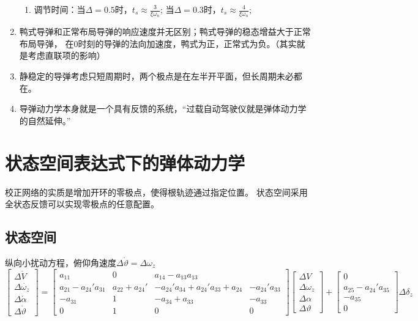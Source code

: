 \begin{enumerate}[1)]
{\begin{enumerate}[i]
        \item 调节时间：当$\Delta = 0.5$时，$t_s\approx \frac{3}{\xi\omega_n}$;
                        当$\Delta = 0.3$时，$t_s\approx \frac{4}{\xi\omega_n}$;
    \end{enumerate}
    }
    \item 鸭式导弹和正常布局导弹的响应速度并无区别；鸭式导弹的稳态增益大于正常布局导弹，
    在0时刻的导弹的法向加速度，鸭式为正，正常式为负。（其实就是考虑直联项的影响）
    \item 静稳定的导弹考虑只短周期时，两个极点是在左半开平面，但长周期未必都在。
    \item 导弹动力学本身就是一个具有反馈的系统，“过载自动驾驶仪就是弹体动力学的自然延伸。”
\end{enumerate}
\section{状态空间表达式下的弹体动力学}
校正网络的实质是增加开环的零极点，使得根轨迹通过指定位置。
状态空间采用全状态反馈可以实现零极点的任意配置。
\subsection{状态空间}
纵向小扰动方程，俯仰角速度$\Delta\dot{\vartheta}=\Delta\omega_z$
\begin{equation*}
    \left[
        \begin{smallmatrix}
            \Delta\dot{V}\\
            \Delta\dot{\omega_z}\\
            \Delta\dot{\alpha}\\
            \Delta\dot{\vartheta}
        \end{smallmatrix}
    \right] = 
    \left[
    \begin{smallmatrix}
        a_{11} & 0 &a_{14}-a_{13} a_{13} \\
        a_{21}-a_{24}'a_{31} &a_{22}+a_{24}' &-a_{24}'a_{34}+a_{24}'a_{33}+a_{24} &-a_{24}'a_{33}\\
        -a_{31} &1 &-a_{34}+a_{33} &-a_{33}\\
        0 &1 &0 &0
    \end{smallmatrix}
    \right]
    \left[
    \begin{smallmatrix}
        \Delta{V}\\
        \Delta{\omega_z}\\
        \Delta{\alpha}\\
        \Delta{\vartheta}
    \end{smallmatrix}
    \right]+
    \left[
    \begin{smallmatrix}
        0\\
        a_{25}-a_{24}'a_{35}\\
        -a_{35}\\
        0
    \end{smallmatrix}
    \right]
    \Delta\delta_z
\end{equation*}

